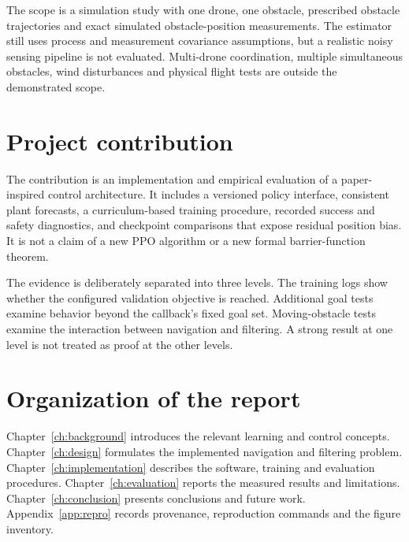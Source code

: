 The scope is a simulation study with one drone, one obstacle, prescribed obstacle trajectories and exact simulated obstacle-position measurements. The estimator still uses process and measurement covariance assumptions, but a realistic noisy sensing pipeline is not evaluated. Multi-drone coordination, multiple simultaneous obstacles, wind disturbances and physical flight tests are outside the demonstrated scope.

\section{Project contribution}
The contribution is an implementation and empirical evaluation of a paper-inspired control architecture. It includes a versioned policy interface, consistent plant forecasts, a curriculum-based training procedure, recorded success and safety diagnostics, and checkpoint comparisons that expose residual position bias. It is not a claim of a new PPO algorithm or a new formal barrier-function theorem.

The evidence is deliberately separated into three levels. The training logs show whether the configured validation objective is reached. Additional goal tests examine behavior beyond the callback's fixed goal set. Moving-obstacle tests examine the interaction between navigation and filtering. A strong result at one level is not treated as proof at the other levels.

\section{Organization of the report}
Chapter~\ref{ch:background} introduces the relevant learning and control concepts. Chapter~\ref{ch:design} formulates the implemented navigation and filtering problem. Chapter~\ref{ch:implementation} describes the software, training and evaluation procedures. Chapter~\ref{ch:evaluation} reports the measured results and limitations. Chapter~\ref{ch:conclusion} presents conclusions and future work. Appendix~\ref{app:repro} records provenance, reproduction commands and the figure inventory.

